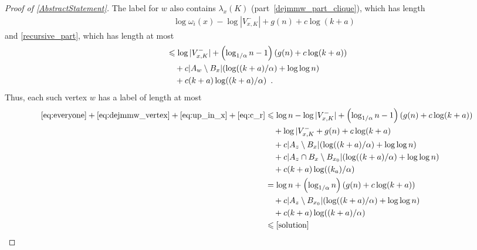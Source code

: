 \documentclass{patmorin}
\newcommand{\torso}[2]{{#1}\langle{#2}\rangle}
\renewcommand{\le}{\leqslant}
\let\eqref\cref
\begin{document}
\begin{proof}[Proof of \cref{AbstractStatement}]
    The label for $w$ also contains $\lambda_x(K)$  (part~\ref{dejmmw_part_clique}), which has length
    \begin{align}
        & \quad \log\omega_i(x) -\log|V^-_{x,K}| + g(n) + c\log(k+a)
    \end{align}
    and \ref{recursive_part}, which has length at most
    \begin{align}
        & \le \log |V^-_{x,K}|+\left(\log_{1/\alpha}n-1\right)(g(n) + c\log(k+a)) \notag \\
        & \quad {} + c|A_w\setminus B_x|(\log((k+a)/\alpha)+\log\log n) \notag \\
        & \quad {} + c(k+a)\log((k+a)/\alpha) \label{eq:c_r} \enspace .
    \end{align}
    Thus, each such vertex $w$ has a label of length at most
    \begin{align*}
              \eqref{eq:everyone} + \eqref{eq:dejmmw_vertex} + \eqref{eq:up_in_x}  + \eqref{eq:c_r}
      & \le \log n - \log|V^-_{x,K}| + \left(\log_{1/\alpha} n-1\right)(g(n)+ c\log(k+a)) \\
      & \quad {} + \log|V^-_{x,K} + g(n) + c\log(k+a) \\
      & \quad {} + c|A_z\setminus B_{x}|(\log((k+a)/\alpha) + \log\log n) \\
      & \quad {} + c|A_z\cap B_x\setminus B_{x_0}|(\log((k+a)/\alpha) + \log\log n) \\
      & \quad {} + c(k+a)\log((k_a)/\alpha) \\
      & = \log n + \left(\log_{1/\alpha} n\right)(g(n)+ c\log(k+a)) \\
      & \quad {} + c|A_z\setminus B_{x_0}|(\log((k+a)/\alpha) + \log\log n) \\
      & \quad {} + c(k+a)\log((k+a)/\alpha) \\
      & \le \eqref{solution}
    \end{align*}






\end{proof}
\end{document}
